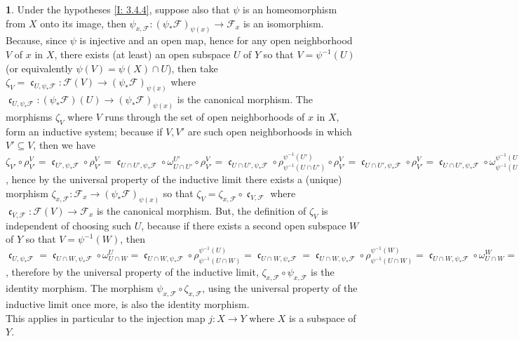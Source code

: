\documentclass[12pt]{amsart}
\newcommand{\can}{\operatorname{\mathfrak{c}}}
\theoremstyle{definition}
\newtheorem{bk}[proposition]{}
\begin{document}
\begin{bk}\label{I: 3.4.5} Under the hypotheses \ref{I: 3.4.4}, suppose also that $\psi$ is an homeomorphism from $X$ onto its image, then
$\psi_{x,\mathscr{F}}:(\psi_{\ast}\mathscr{F})_{\psi(x)}
\rightarrow\mathscr{F}_{x}$ is an isomorphism. Because, since $\psi$ is injective and an open map, hence for any open neighborhood $V$ of $x$ in $X$, there exists (at least) an open subspace $U$ of $Y$ so that $V=\psi^{-1}(U)$ (or equivalently $\psi(V)=\psi(X)\cap U$), then take $\zeta_{V}=\can_{U,\psi_{\ast}\mathscr{F}}:\mathscr{F}(V)
\rightarrow(\psi_{\ast}\mathscr{F})_{\psi(x)}$ where  $\can_{U,\psi_{\ast}\mathscr{F}}
:(\psi_{\ast}\mathscr{F})(U)\rightarrow(\psi_{\ast}\mathscr{F})_{\psi(x)}$ is the canonical morphism. The morphisms $\zeta_{V}$ where $V$ runs through the set of open neighborhoods of $x$ in $X$, form an inductive system; because if $V,V'$ are such open neighborhoods in which $V'\subseteq V$, then we have $\zeta_{V'}\circ\rho_{V'}^{V}=
\can_{U',\psi_{\ast}\mathscr{F}}\circ\rho_{V'}^{V}=
\can_{U\cap U',\psi_{\ast}\mathscr{F}}\circ\omega_{U\cap U'}^{U'}\circ\rho_{V'}^{V}=\can_{U\cap U',\psi_{\ast}\mathscr{F}}\circ\rho_{\psi^{-1}(U\cap U')}^{\psi^{-1}( U')} \circ\rho_{V'}^{V}=\can_{U\cap U',\psi_{\ast}\mathscr{F}}\circ\rho_{V'}^{V}=\can_{U\cap U',\psi_{\ast}\mathscr{F}}\circ\omega_{\psi^{-1}(U\cap U')}^{\psi^{-1}( U)}=\can_{U,\psi_{\ast}\mathscr{F}}=\zeta_{V}$, hence by the universal property of the inductive limit there exists a (unique) morphism $\zeta_{x,\mathscr{F}}:
\mathscr{F}_{x}\rightarrow(\psi_{\ast}\mathscr{F})_{\psi(x)}$ so that $\zeta_{V}=\zeta_{x,\mathscr{F}}\circ\can_{V,\mathscr{F}}$ where $\can_{V,\mathscr{F}}:\mathscr{F}(V)\rightarrow\mathscr{F}_{x}$ is the canonical morphism. But, the definition of $\zeta_{V}$ is independent of choosing such $U$, because if there exists a second open subspace $W$ of $Y$ so that $V=\psi^{-1}(W)$, then $\can_{U,\psi_{\ast}\mathscr{F}}=\can_{U\cap W,\psi_{\ast}\mathscr{F}}\circ\omega_{U\cap W}^{U}=\can_{U\cap W,\psi_{\ast}\mathscr{F}}\circ\rho_{\psi^{-1}(U\cap W)}^{\psi^{-1}(U)}=\can_{U\cap W,\psi_{\ast}\mathscr{F}}=\can_{U\cap W,\psi_{\ast}\mathscr{F}}\circ\rho_{\psi^{-1}(U\cap W)}^{\psi^{-1}(W)}=\can_{U\cap W,\psi_{\ast}\mathscr{F}}\circ\omega_{U\cap W}^{W}=\can_{W,\psi_{\ast}\mathscr{F}}$, therefore by the universal property of the inductive limit,  $\zeta_{x,\mathscr{F}}\circ\psi_{x,\mathscr{F}}$ is the identity morphism. The morphism $\psi_{x,\mathscr{F}}\circ\zeta_{x,\mathscr{F}}$, using the universal property of the inductive limit once more, is also the identity morphism. \\ This applies in particular to the injection map $j:X\rightarrow Y$ where $X$ is a subspace of $Y$. \\
\end{bk}
\end{document}
